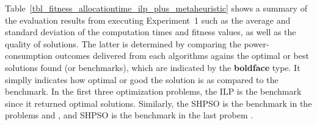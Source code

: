 
Table~\ref{tbl_fitness_allocationtime_ilp_plus_metaheuristic} shows a summary of the evaluation results from executing Experiment~1 such as the average and standard deviation of the computation times and fitness values, as well as the quality of solutions. The latter is determined by comparing the power-consumption outcomes delivered from each algorithms agains the optimal or best solutions found (or benchmarks), which are indicated by the \textbf{boldface} type. It simplly indicates how optimal or good the solution is as compared to the benchmark. In the first three optimization problems, the ILP is the benchmark since it returned optimal solutions. Similarly, the SHPSO is the benchmark in the problems  and , and SHPSO is the benchmark in the last probem .


